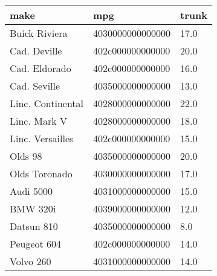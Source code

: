 \documentclass{article}
\begin{document}
\begin{table}[tbp] \centering
{}

\begin{tabularx}{\linewidth}{lCC}

\toprule
{make}&{mpg}&{trunk} \tabularnewline
\midrule \addlinespace[\belowrulesep]
Buick Riviera&4030000000000000&17.0 \tabularnewline
Cad. Deville&402c000000000000&20.0 \tabularnewline
Cad. Eldorado&402c000000000000&16.0 \tabularnewline
Cad. Seville&4035000000000000&13.0 \tabularnewline
Linc. Continental&4028000000000000&22.0 \tabularnewline
Linc. Mark V&4028000000000000&18.0 \tabularnewline
Linc. Versailles&402c000000000000&15.0 \tabularnewline
Olds 98&4035000000000000&20.0 \tabularnewline
Olds Toronado&4030000000000000&17.0 \tabularnewline
Audi 5000&4031000000000000&15.0 \tabularnewline
BMW 320i&4039000000000000&12.0 \tabularnewline
Datsun 810&4035000000000000&8.0 \tabularnewline
Peugeot 604&402c000000000000&14.0 \tabularnewline
Volvo 260&4031000000000000&14.0 \tabularnewline
\bottomrule 

\end{tabularx}
\end{table}
\end{document}
